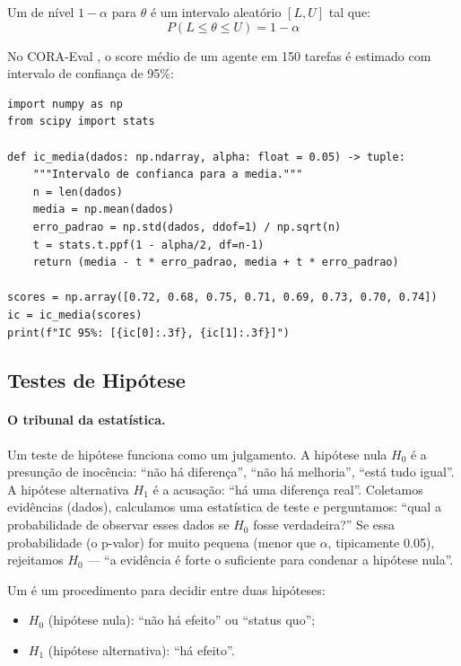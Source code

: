 \begin{definicao}
    Um  de nível $1 - \alpha$ para
    $\theta$ é um intervalo aleatório $[L, U]$ tal que:
    \[
    P(L \leq \theta \leq U) = 1 - \alpha
    \]
\end{definicao}

\begin{exemplo}
    No CORA-Eval \cite{laranjeira2026cora}, o score médio de um agente em
    150 tarefas é estimado com intervalo de confiança de 95\%:
    \begin{lstlisting}[style=pythonstyle]
import numpy as np
from scipy import stats

def ic_media(dados: np.ndarray, alpha: float = 0.05) -> tuple:
    """Intervalo de confianca para a media."""
    n = len(dados)
    media = np.mean(dados)
    erro_padrao = np.std(dados, ddof=1) / np.sqrt(n)
    t = stats.t.ppf(1 - alpha/2, df=n-1)
    return (media - t * erro_padrao, media + t * erro_padrao)

scores = np.array([0.72, 0.68, 0.75, 0.71, 0.69, 0.73, 0.70, 0.74])
ic = ic_media(scores)
print(f"IC 95%: [{ic[0]:.3f}, {ic[1]:.3f}]")
    \end{lstlisting}
\end{exemplo}

\subsection{Testes de Hipótese}

\paragraph{O tribunal da estatística.} Um teste de hipótese funciona como um
julgamento. A hipótese nula $H_0$ é a presunção de inocência: ``não há
diferença'', ``não há melhoria'', ``está tudo igual''. A hipótese alternativa
$H_1$ é a acusação: ``há uma diferença real''. Coletamos evidências (dados),
calculamos uma estatística de teste e perguntamos: ``qual a probabilidade de
observar esses dados se $H_0$ fosse verdadeira?'' Se essa probabilidade (o
p-valor) for muito pequena (menor que $\alpha$, tipicamente 0.05),
rejeitamos $H_0$ --- ``a evidência é forte o suficiente para condenar a
hipótese nula''.

\begin{definicao}
    Um  é um procedimento para decidir entre
    duas hipóteses:
    \begin{itemize}
        \item $H_0$ (hipótese nula): ``não há efeito'' ou ``status quo'';
        \item $H_1$ (hipótese alternativa): ``há efeito''.
    \end{itemize}
\end{definicao}

